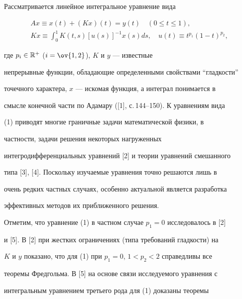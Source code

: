 \label{begin} 


 


 


Рассматривается линейное интегральное уравнение вида 


\begin{equation} 


\begin{array}{c} 


A x\equiv x(t)+(K x)(t)=y(t)\quad (0\le t\le1),\\[3mm] 


K x\equiv\displaystyle\int^1_0 K(t,s)[u(s)]^{-1}x(s)ds, 


\quad u(t)\equiv t^{p_1}(1-t)^{p_2}, 


\end{array} 


\end{equation} 


где $p_i\in \Bbb R^+$ ($i=\ov{1,2}$), $K$ и $y$ --- известные 


непрерывные функции, обладающие определенными свойствами ``гладкости'' 


точечного характера, $x$ --- искомая функция, а интеграл понимается в 


смысле конечной части по Адамару ([1], с.\,144--150). К уравнениям вида 


(1) приводят многие граничные задачи математической физики, в 


частности, задачи решения некоторых нагруженных 


интегродифференциальных уравнений [2] и теории уравнений смешанного 


типа [3], [4]. Поскольку изучаемые уравнения точно решаются лишь в 


очень редких частных случаях, особенно актуальной является разработка 


эффективных методов их приближенного решения. 


 


Отметим, что уравнение (1) в частном случае $p_1=0$ исследовалось в [2] 


и [5]. В [2] при жестких ограничениях (типа требований гладкости) на 


$K$ и $y$ показано, что для (1) при $p_1=0$, $1<p_2<2$ справедливы все 


теоремы Фредгольма. В [5] на основе связи исследуемого уравнения с 


интегральным уравнением третьего рода для (1) доказаны теоремы 


